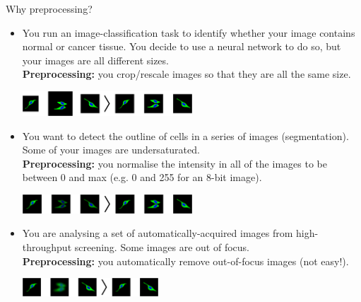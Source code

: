 \documentclass[9pt, aspectratio=169]{beamer}
\begin{document}
\begin{frame}
	{Why preprocessing?}
	\begin{itemize}
		\item
		      \begin{multicols*}{2}
			      You run an image-classification task to identify whether your image contains normal or cancer tissue. You decide to use a neural network to do so, but your images are all different sizes.\\
			      \columnbreak
			      \textbf{Preprocessing:} you crop/rescale images so that they are all the same size.

			      \centering
			      \includegraphics[width=0.5\textwidth]{preproc_example1.png}
		      \end{multicols*}
		      \pause
		\item
		      \begin{multicols*}{2}
			      You want to detect the outline of cells in a series of images (segmentation). Some of your images are undersaturated.\\
			      \columnbreak
			      \textbf{Preprocessing:} you normalise the intensity in all of the images to be between 0 and max (e.g. 0 and 255 for an 8-bit image).

			      \centering
			      \includegraphics[width=0.5\textwidth]{preproc_example2.png}
		      \end{multicols*}
		      \pause
		\item
		      \begin{multicols*}{2}
			      You are analysing a set of automatically-acquired images from high-throughput screening. Some images are out of focus.\\
			      \columnbreak
			      \textbf{Preprocessing:} you automatically remove out-of-focus images (not easy!).

			      \centering
			      \includegraphics[width=0.4\textwidth]{preproc_example3.png}
		      \end{multicols*}

	\end{itemize}
\end{frame}
\end{document}
